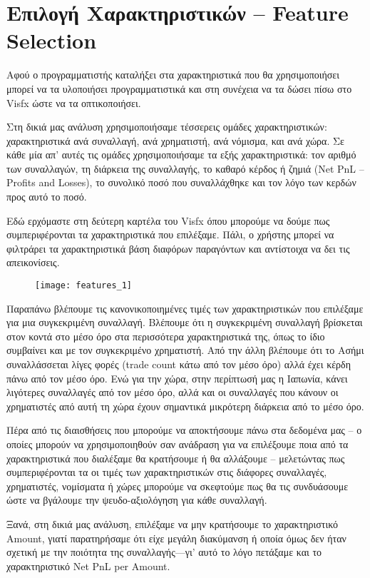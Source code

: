 \section{Επιλογή Χαρακτηριστικών – Feature Selection}

Αφού ο προγραμματιστής καταλήξει στα χαρακτηριστικά που θα χρησιμοποιήσει μπορεί να τα υλοποιήσει προγραμματιστικά και στη συνέχεια να τα δώσει πίσω στο Visfx ώστε να τα οπτικοποιήσει. 

Στη δικιά μας ανάλυση χρησιμοποιήσαμε τέσσερεις ομάδες χαρακτηριστικών: χαρακτηριστικά ανά συναλλαγή, ανά χρηματιστή, ανά νόμισμα, και ανά χώρα. Σε κάθε μία απ’ αυτές τις ομάδες χρησιμοποιήσαμε τα εξής χαρακτηριστικά: τον αριθμό των συναλλαγών, τη διάρκεια της συναλλαγής, το καθαρό κέρδος ή ζημιά (Net PnL – Profits and Losses), το συνολικό ποσό που συναλλάχθηκε και τον λόγο των κερδών προς αυτό το ποσό.

Εδώ ερχόμαστε στη δεύτερη καρτέλα του Visfx όπου μπορούμε να δούμε πως συμπεριφέρονται τα χαρακτηριστικά που επιλέξαμε. Πάλι, ο χρήστης μπορεί να φιλτράρει τα χαρακτηριστικά βάση διαφόρων παραγόντων και αντίστοιχα να δει τις απεικονίσεις.

\begin{figure}[H]
  \centering
  \texttt{[image: features\_1]}
  \label{fig:features_1}
\end{figure}

Παραπάνω βλέπουμε τις κανονικοποιημένες τιμές των χαρακτηριστικών που επιλέξαμε για μια συγκεκριμένη συναλλαγή. Βλέπουμε ότι η συγκεκριμένη συναλλαγή βρίσκεται στον κοντά στο μέσο όρο στα περισσότερα χαρακτηριστικά της, όπως το ίδιο συμβαίνει και με τον συγκεκριμένο χρηματιστή. Από την άλλη βλέπουμε ότι το Ασήμι συναλλάσσεται λίγες φορές (trade count κάτω από τον μέσο όρο) αλλά έχει κέρδη πάνω από τον μέσο όρο. Ενώ για την χώρα, στην περίπτωσή μας η Ιαπωνία, κάνει λιγότερες συναλλαγές από τον μέσο όρο, αλλά και οι συναλλαγές που κάνουν οι χρηματιστές από αυτή τη χώρα έχουν σημαντικά μικρότερη διάρκεια από το μέσο όρο.

Πέρα από τις διαισθήσεις που μπορούμε να αποκτήσουμε πάνω στα δεδομένα μας – ο οποίες μπορούν να χρησιμοποιηθούν σαν ανάδραση για να επιλέξουμε ποια από τα χαρακτηριστικά που διαλέξαμε θα κρατήσουμε ή θα αλλάξουμε – μελετώντας πως συμπεριφέρονται τα οι τιμές των χαρακτηριστικών στις διάφορες συναλλαγές, χρηματιστές, νομίσματα ή χώρες μπορούμε να σκεφτούμε πως θα τις συνδυάσουμε ώστε να βγάλουμε την ψευδο-αξιολόγηση για κάθε συναλλαγή.

Ξανά, στη δικιά μας ανάλυση, επιλέξαμε να μην κρατήσουμε το χαρακτηριστικό Amount, γιατί παρατηρήσαμε ότι είχε μεγάλη διακύμανση ή οποία όμως δεν ήταν σχετική με την ποιότητα της συναλλαγής—γι’ αυτό το λόγο πετάξαμε και το χαρακτηριστικό Net PnL per Amount. 

